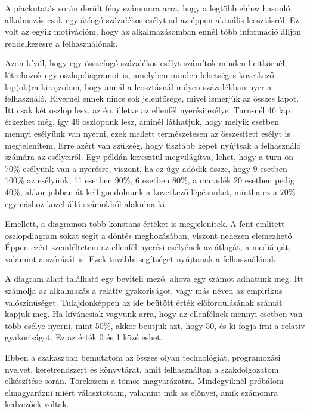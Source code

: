 
A piackutatás során derült fény számomra arra, hogy a legtöbb ehhez hasonló alkalmazás csak egy átfogó százalékos esélyt ad az éppen aktuális leosztásról. Ez volt az egyik motivációm, hogy az alkalmazásomban ennél több információ álljon rendelkezésre a felhasználónak.

Azon kívül, hogy egy összefogó százalékos esélyt számítok minden licitkörnél, létrehozok egy oszlopdiagramot is, amelyben minden lehetséges következő lap(ok)ra kirajzolom, hogy annál a leosztásnál milyen százalékban nyer a felhasználó. Rivernél ennek nincs sok jelentősége, mivel ismerjük az összes lapot. Itt csak két oszlop lesz, az én, illetve az ellenfél nyerési esélye. Turn-nél 46 lap érkezhet még, így 46 oszlopunk lesz, aminél láthatjuk, hogy melyik esetben mennyi esélyünk van nyerni, ezek mellett természetesen az összesített esélyt is megjelenítem. Erre azért van szükség, hogy tisztább képet nyújtsak a felhasználó számára az esélyeiről. Egy példán keresztül megvilágítva, lehet, hogy a turn-ön 70\% esélyünk van a nyerésre, viszont, ha ez úgy adódik össze, hogy 9 esetben 100\% az esélyünk, 11 esetben 90\%, 6 esetben 80\%, a maradék 20 esetben pedig 40\%, akkor jobban át kell gondolnunk a következő lépésünket, mintha ez a 70\% egymáshoz közel álló számokból alakulna ki.

Emellett, a diagramon több konstans értéket is megjelenítek. A fent említett oszlopdiagram sokat segít a döntés meghozásában, viszont nehezen elemezhető. Éppen ezért szemléltetem az ellenfél nyerési esélyének az átlagát, a mediánját, valamint a szórását is. Ezek további segítséget nyújtanak a felhasználónak.

A diagram alatt található egy beviteli mező, ahova egy számot adhatunk meg. Itt számolja az alkalmazás a relatív gyakoriságot, vagy más néven az empirikus valószínűséget. Tulajdonképpen az ide beütött érték előfordulásának számát kapjuk meg. Ha kíváncsiak vagyunk arra, hogy az ellenfélnek mennyi esetben van több esélye nyerni, mint 50\%, akkor beütjük azt, hogy 50, és ki fogja írni a relatív gyakoriságot. Ez az érték 0 és 1 közé eshet.


Ebben a szakaszban bemutatom az összes olyan technológiát, programozási nyelvet, keretrendszert és könyvtárat, amit felhasználtan a szakdolgozatom elkészítése során. Törekszem a tömör magyarázatra. Mindegyiknél próbálom elmagyarázni miért választottam, valamint mik az előnyei, amik számomra kedvezőek voltak.

